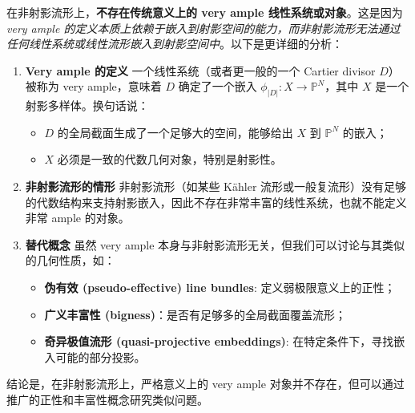 \documentclass[lang=cn,zihao=-4,a4paper,fontset=none]{beautybook}
\begin{document}
\begin{solution}
     
在非射影流形上，\textbf{不存在传统意义上的 very ample 线性系统或对象}。这是因为 \textit{very ample 的定义本质上依赖于嵌入到射影空间的能力，而非射影流形无法通过任何线性系统或线性流形嵌入到射影空间中}。以下是更详细的分析：
\begin{enumerate}
    \item \textbf{Very ample 的定义 } 
一个线性系统（或者更一般的一个 Cartier divisor $D$）被称为 very ample，意味着 $D$ 确定了一个嵌入 $\phi_{|D|}: X \to \mathbb{P}^N$，其中 $X$ 是一个射影多样体。换句话说：
\begin{itemize}
    \item  $D$ 的全局截面生成了一个足够大的空间，能够给出 $X$ 到 $\mathbb{P}^N$ 的嵌入；
    \item $X$ 必须是一致的代数几何对象，特别是射影性。
\end{itemize}

\item  \textbf{非射影流形的情形} 
非射影流形（如某些 Kähler 流形或一般复流形）没有足够的代数结构来支持射影嵌入，因此不存在非常丰富的线性系统，也就不能定义非常 ample 的对象。

\item  \textbf{替代概念}  
虽然 very ample 本身与非射影流形无关，但我们可以讨论与其类似的几何性质，如：
\begin{itemize}
\item  \textbf{伪有效 (pseudo-effective) line bundles}: 定义弱极限意义上的正性；
\item  \textbf{广义丰富性 (bigness)}：是否有足够多的全局截面覆盖流形；
\item  \textbf{奇异极值流形 (quasi-projective embeddings)}: 在特定条件下，寻找嵌入可能的部分投影。
\end{itemize}
\end{enumerate}
结论是，在非射影流形上，严格意义上的 very ample 对象并不存在，但可以通过推广的正性和丰富性概念研究类似问题。
\end{solution}
    















\ISBNcode{\EANisbn[ISBN=978-80-7340-097-2]} %
\makebottomcover
\end{document}
